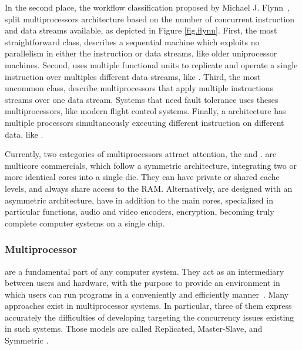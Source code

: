 			In the second place, the workflow classification proposed by Michael J. Flynn~\cite{flynn:1972},
			split multiprocessors architecture based on the number of concurrent
			instruction and data streams available, as depicted in Figure \ref{fig.flynn}.
			First, the most straightforward class, \sisd describes a sequential
			machine which exploits no parallelism in either the instruction or
			data streams, like older uniprocessor machines.
			Second, \simd uses multiple functional units to replicate and operate
			a single instruction over multiples different data streams, like \gpu.
			Third, the most uncommon class, \misd describe multiprocessors that
			apply multiple instructions streams over one data stream.
			Systems that need fault tolerance uses theses multiprocessors, like
			modern flight control systems.
			Finally, a \mimd architecture has multiple processors simultaneously
			executing different instruction on different data, like \xeonphi.

			Currently, two categories of multiprocessors attract attention, the \cmp and .
			\cmps are multicore commercials, which follow a symmetric architecture,
			integrating two or more identical cores into a single die.
			They can have private or shared cache levels, and always share access
			to the RAM.
			Alternatively, \socs are designed with an asymmetric architecture,
			have in addition to the main cores, specialized \cpus in particular
			functions, \eg audio and video encoders, encryption, becoming truly
			complete computer systems on a single chip.
			

		\subsubsection{Multiprocessor \oses}
		\label{sec.multiprocessor-os}

			\oses are a fundamental part of any computer system.
			They act as an intermediary between users and hardware, with the
			purpose to provide an environment in which users can run programs
			in a conveniently and efficiently manner~\cite{Silberschatz:9ed}.
			Many \os approaches exist in multiprocessor systems.
			In particular, three of them express accurately the difficulties
			of developing \oses targeting the concurrency issues existing in
			such systems.
			Those models are called Replicated, Master-Slave, and Symmetric \os.

